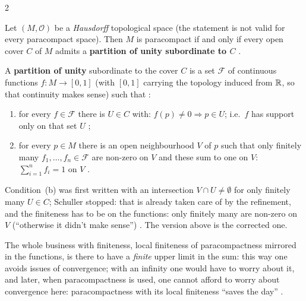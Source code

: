 \begin{paracol}{2}
\begin{theorem}\label{thm:iv-pou}
Let $(M,\mathcal O)$ be a \emph{Hausdorff} topological space (the statement is not valid for every paracompact space). Then $M$ is paracompact if and only if every open cover $C$ of $M$ admits a
\textbf{partition of unity subordinate to $C$} .
\end{theorem}
\begin{definition}\label{def:iv-pou}
A \textbf{partition of unity} subordinate to the cover $C$ is a set $\mathcal F$ of continuous functions $f\colon M\to[0,1]$ (with $[0,1]$ carrying the topology induced from $\mathbb{R}$, so that
continuity makes sense) such that :
\begin{enumerate}
  \item[(a)] for every $f\in\mathcal F$ there is $U\in C$ with: $f(p)\ne0\Rightarrow p\in U$; i.e.\ $f$ has support only on that set $U$ ;
  \item[(b)] for every $p\in M$ there is an open neighbourhood $V$ of $p$ such that only finitely many $f_1,\dots,f_n\in\mathcal F$ are non-zero on $V$ and these
        sum to one on $V$: $\sum_{i=1}^nf_i=1$ on $V$ .
\end{enumerate}
\end{definition}
\begin{coursenote}
Condition~(b) was first written with an intersection $V\cap U\ne\emptyset$ for only finitely many $U\in C$; Schuller stopped: that is already taken care of by the refinement, and the
finiteness has to be on the functions: only finitely many are non-zero on $V$ (``otherwise it didn't make sense'') . The version above is the corrected one.
\end{coursenote}
The whole business with finiteness, local finiteness of paracompactness mirrored in the functions, is there to have a \emph{finite} upper limit in the sum: this way one avoids issues of convergence;
with an infinity one would have to worry about it, and later, when paracompactness is used, one cannot afford to worry about convergence here: paracompactness with its local finiteness ``saves the day''
.


\end{paracol}
